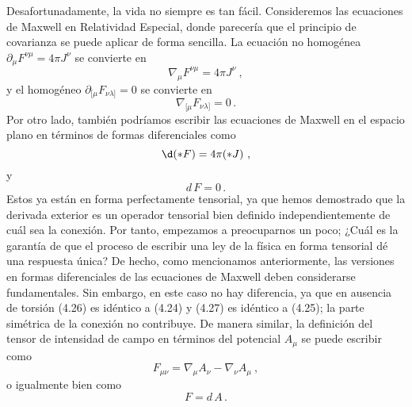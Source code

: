 \documentclass[11pt,b5paper,openany,twoside]{book}
\newcommand{\mn}{{\mu\nu}}
\newcommand{\p}[1]{{\partial_{#1}}}
\begin{document}
Desafortunadamente, la vida no siempre es tan fácil.
Consideremos las ecuaciones de Maxwell en Relatividad Especial, donde parecería que el principio de covarianza se puede aplicar de forma sencilla.
La ecuación no homogénea $\p\mu F^{\nu\mu} = 4\pi J^\nu$ se convierte en
\begin{equation}
\nabla_\mu F^{\nu\mu} = 4\pi J^\nu\ ,\label{4.24}
\end{equation}
y el homogéneo $\p{[\mu} F_{\nu\lambda]}= 0$ se convierte en
\begin{equation}
\nabla_{[\mu} F_{\nu\lambda]}= 0\,.\label{4.25}
\end{equation}
Por otro lado, también podríamos escribir las ecuaciones de Maxwell en el espacio plano en términos de formas diferenciales como
\begin{equation}
\d(*F) = 4\pi(* J)\ ,\label{4.26}
\end{equation}
y
\begin{equation}
 d\,F = 0\,.\label{4.27}
\end{equation}
Estos ya están en forma perfectamente tensorial, ya que hemos demostrado que la derivada exterior es un operador tensorial bien definido independientemente de cuál sea la conexión.
Por tanto, empezamos a preocuparnos un poco; ¿Cuál es la garantía de que el proceso de escribir una ley de la física en forma tensorial dé una respuesta única? De hecho, como mencionamos anteriormente, las versiones en formas diferenciales de las ecuaciones de Maxwell deben considerarse fundamentales.
Sin embargo, en este caso no hay diferencia, ya que en ausencia de torsión (4.26) es idéntico a (4.24) y (4.27) es idéntico a (4.25); la parte simétrica de la conexión no contribuye.
De manera similar, la definición del tensor de intensidad de campo en términos del potencial $A_\mu$ se puede escribir como
\begin{equation}
F_{\mn} = \nabla_\mu A_\nu - \nabla_\nu A_\mu\ ,\label{4.28}
\end{equation}
o igualmente bien como
\begin{equation}
F= d\,A\,.\label{4.29}
\end{equation}
\end{document}
